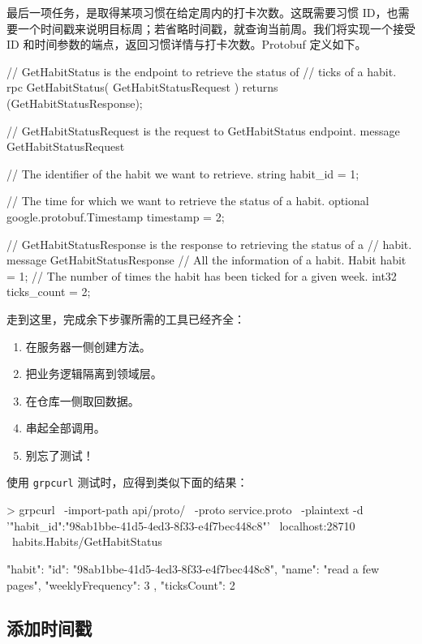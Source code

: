 最后一项任务，是取得某项习惯在给定周内的打卡次数。这既需要习惯 ID，也需要一个时间戳来说明目标周；若省略时间戳，就查询当前周。我们将实现一个接受 ID 和时间参数的端点，返回习惯详情与打卡次数。Protobuf 定义如下。

\begin{protocode}[title={代码清单 10.37 \texttt{api/proto/service.proto}：定义 \texttt{GetHabitStatus}}]
// GetHabitStatus is the endpoint to retrieve the status of
// ticks of a habit.
rpc GetHabitStatus(
    GetHabitStatusRequest
) returns (GetHabitStatusResponse);

// GetHabitStatusRequest is the request to GetHabitStatus endpoint.
message GetHabitStatusRequest {
    // The identifier of the habit we want to retrieve.
    string habit_id = 1;

    // The time for which we want to retrieve the status of a habit.
    optional google.protobuf.Timestamp timestamp = 2;
}

// GetHabitStatusResponse is the response to retrieving the status of a
// habit.
message GetHabitStatusResponse {
    // All the information of a habit.
    Habit habit = 1;
    // The number of times the habit has been ticked for a given week.
    int32 ticks_count = 2;
}
\end{protocode}

走到这里，完成余下步骤所需的工具已经齐全：

\begin{enumerate}
  \item 在服务器一侧创建方法。
  \item 把业务逻辑隔离到领域层。
  \item 在仓库一侧取回数据。
  \item 串起全部调用。
  \item 别忘了测试！
\end{enumerate}

使用 \texttt{grpcurl} 测试时，应得到类似下面的结果：

\begin{shellcode}[]
> grpcurl \
-import-path api/proto/ \
-proto service.proto \
-plaintext -d '{"habit_id":"98ab1bbe-41d5-4ed3-8f33-e4f7bec448c8"}' \
localhost:28710 \
habits.Habits/GetHabitStatus

{
  "habit": {
    "id": "98ab1bbe-41d5-4ed3-8f33-e4f7bec448c8",
    "name": "read a few pages",
    "weeklyFrequency": 3
  },
  "ticksCount": 2
}
\end{shellcode}

\subsection{添加时间戳}


